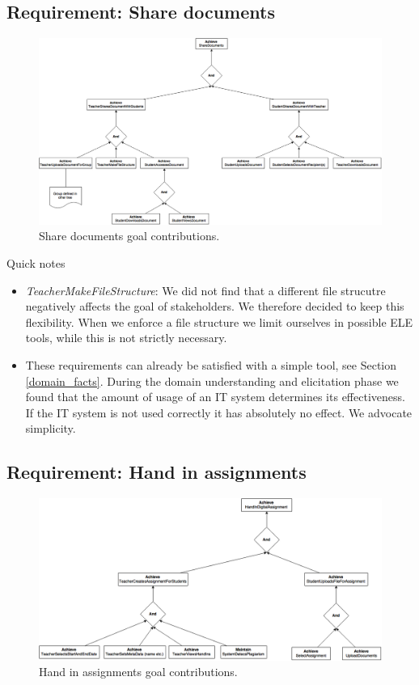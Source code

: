 \clearpage
\subsection{Requirement: Share documents}
\begin{figure}[h!]
	\centering
	\includegraphics[width=1\linewidth]{images/ShareDocuments.png}
	\caption{Share documents goal contributions.}
	\label{fig:goal_share_documents}
\end{figure}

Quick notes\\
\begin{itemize}
	\item \textit{TeacherMakeFileStructure}: We did not find that a different file strucutre negatively affects the goal of stakeholders. We therefore decided to keep this flexibility. When we enforce a file structure we limit ourselves in possible ELE tools, while this is not strictly necessary.
	\item These requirements can already be satisfied with a simple tool, see Section \ref{domain_facts}. During the domain understanding and elicitation phase we found that the amount of usage of an IT system determines its effectiveness. If the IT system is not used correctly it has absolutely no effect. We advocate simplicity.
\end{itemize}

\clearpage
\subsection{Requirement: Hand in assignments}
\begin{figure}[h!]
	\centering
	\includegraphics[width=1\linewidth]{images/HandInAssignment.png}
	\caption{Hand in assignments goal contributions.}
	\label{fig:goal_hand_in_assignments}
\end{figure}

